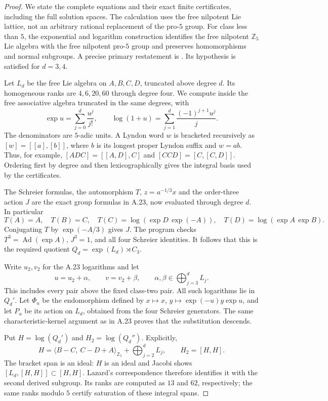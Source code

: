 \begin{proof}
We state the complete equations and their exact finite
certificates, including the full solution spaces.
The calculation uses the free nilpotent Lie lattice,
not an arbitrary rational replacement of the pro-$5$
group. For class less than $5$, the exponential and
logarithm construction identifies the free nilpotent
$\mathbb Z_5$ Lie algebra with the free nilpotent
pro-$5$ group and preserves homomorphisms and normal
subgroups. A precise primary restatement is
\citet[\S2, Theorem 1(a)--(f), and the preceding free
object construction]{A_GaraialdeGonzalez2014}.
Its hypothesis is satisfied for $d=3,4$.

Let $L_d$ be the free Lie algebra on $A,B,C,D$,
truncated above degree $d$. Its homogeneous ranks are
$4,6,20,60$ through degree four. We compute inside
the free associative algebra truncated in the same
degrees, with
\[
 \exp u=\sum_{j=0}^{d}\frac{u^j}{j!},\qquad
 \log(1+u)=\sum_{j=1}^{d}\frac{(-1)^{j+1}u^j}{j}.
\]
The denominators are $5$-adic units. A Lyndon word
$w$ is bracketed recursively as
$[w]=[[a],[b]]$, where $b$ is its longest proper
Lyndon suffix and $w=ab$. Thus, for example,
$[ADC]=[[A,D],C]$ and $[CCD]=[C,[C,D]]$.
Ordering first by degree and then lexicographically
gives the integral basis used by the certificates.

The Schreier formulas, the automorphism $T$,
$z=a^{-1/3}x$ and the order-three action $J$ are
the exact group formulas in A.23, now evaluated
through degree $d$. In particular
\[
 T(A)=A,\quad T(B)=C,\quad
 T(C)=\log(\exp D\,\exp(-A)),\quad
 T(D)=\log(\exp A\,\exp B).
\]
Conjugating $T$ by $\exp(-A/3)$ gives $J$.
The program checks $T^3=\operatorname{Ad}(\exp A)$,
$J^3=1$, and all four Schreier identities.
It follows that this is the required quotient
$Q_d=\exp(L_d)\rtimes C_3$.

Write $u_2,v_2$ for the A.23 logarithms and let
\[
 u=u_2+\alpha,\qquad v=v_2+\beta,\qquad
 \alpha,\beta\in\bigoplus_{j=3}^{d}L_j.
\]
This includes every pair above the fixed class-two
pair. All such logarithms lie in $Q_d'$.
Let $\Phi_u$ be the endomorphism defined by
$x\mapsto x$, $y\mapsto\exp(-u)y\exp u$,
and let $P_u$ be its action on $L_d$, obtained
from the four Schreier generators.
The same characteristic-kernel argument as in
A.23 proves that the substitution descends.

Put $H=\log(Q_d')$ and $H_2=\log(Q_d'')$. Explicitly,
\[
 H=\langle B-C,\ C-D+A\rangle_{\mathbb Z_5}
                   +\bigoplus_{j=2}^{d}L_j,\qquad
 H_2=[H,H].
                                                               \tag{A--IV}
\]
The bracket span is an ideal: $H$ is an ideal and
Jacobi shows $[L_d,[H,H]]\subset[H,H]$.
Lazard's correspondence therefore identifies it
with the second derived subgroup. Its ranks are
computed as $13$ and $62$, respectively; the same
ranks modulo $5$ certify saturation of these
integral spans.


\end{proof}
